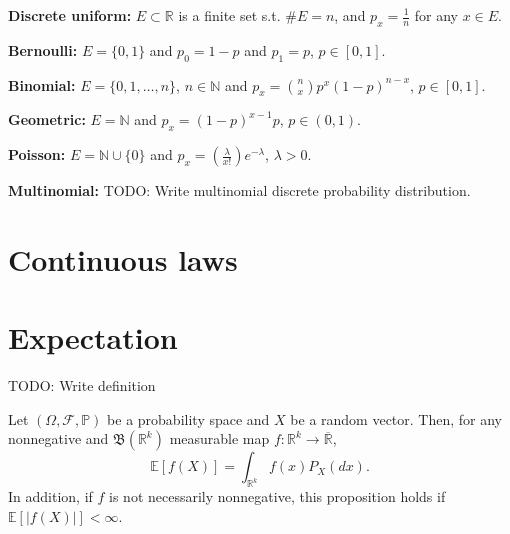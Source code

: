 \begin{myexample}
    \label{myex:Examples_of_discrete_probability_distributions} \hfill

\textbf{Discrete uniform:} $E \subset \mathbb{R}$ is a finite set s.t. $\#E=n$, and $p_x = \frac{1}{n}$ for any $x \in E$.

\textbf{Bernoulli:} $E = \{0,1\} $ and $p_0 = 1-p$ and $p_1 = p$, $p \in [0,1]$.

\textbf{Binomial:} $E=\{0,1, \ldots, n\} $, $n \in \mathbb{N}$ and $p_x=\binom{n}{x} p^{x}(1-p)^{n-x}$, $p \in [0,1]$.

\textbf{Geometric:} $E = \mathbb{N}$ and $p_x = (1-p)^{x-1}p$, $p \in (0,1)$.

\textbf{Poisson:} $E= \mathbb{N} \cup \{0\} $ and $p_x = (\frac{\lambda}{x!})e^{-\lambda}$, $\lambda>0$.

\textbf{Multinomial:} TODO: Write multinomial discrete probability distribution.
\end{myexample}

\section{Continuous laws}%
\label{sec:Continuous laws}

\section{Expectation}%
\label{sec:Expectation}
\begin{definition}[Expectation of $X$]
    \label{def:10.9}
    TODO: Write definition
\end{definition}

\begin{proposition}[Expectation of $f(X)$]
    \label{prop:10.3}
    Let $(\Omega, \mathcal{F}, \mathbb{P})$ be a probability space and $X$ be a random vector.
    Then, for any nonnegative and $\mathfrak{B}(\mathbb{R}^{k})$ measurable map $f: \mathbb{R}^{k}\to 
    \overline{\mathbb{R}}$,
    \[
    \mathbb{E}[f(X)]= \int_{\mathbb{R}^{k}} f(x)P_X(dx)
    .\] 
    In addition, if $f$ is not necessarily nonnegative, this proposition holds if $\mathbb{E}[|f(X)|]<\infty$.
\end{proposition}



